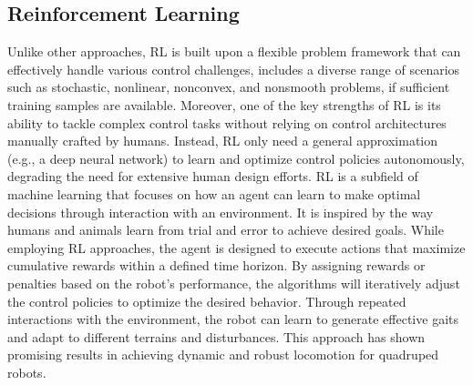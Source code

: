 \subsection{Reinforcement Learning}
Unlike other approaches, \ac{RL} is built upon a flexible problem framework that can effectively handle various control challenges,  includes a diverse range of scenarios such as stochastic, nonlinear, nonconvex, and nonsmooth problems, if sufficient training samples are available. Moreover, one of the key strengths of \ac{RL} is its ability to tackle complex control tasks without relying on control architectures manually crafted by humans. Instead, \ac{RL} only need a general approximation (e.g., a deep neural network) to learn and optimize control policies autonomously, degrading the need for extensive human design efforts. \ac{RL} is a subfield of machine learning that focuses on how an agent can learn to make optimal decisions through interaction with an environment. It is inspired by the way humans and animals learn from trial and error to achieve desired goals. While employing \ac{RL} approaches, the agent is designed to execute actions that maximize cumulative rewards within a defined time horizon. By assigning rewards or penalties based on the robot's performance, the algorithms will iteratively adjust the control policies to optimize the desired behavior. Through repeated interactions with the environment, the robot can learn to generate effective gaits and adapt to different terrains and disturbances. This approach has shown promising results in achieving dynamic and robust locomotion for quadruped robots\cite{jiConcurrentTrainingControl2022}. 

